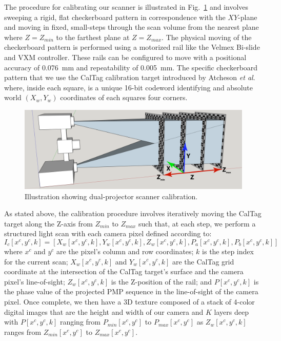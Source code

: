\documentclass[]{spie}  %
\begin{document}
The procedure for calibrating our scanner is illustrated in Fig.~\ref{Fig:20} and involves sweeping a rigid, flat checkerboard pattern in correspondence with the $XY$-plane and moving in fixed, small-steps through the scan volume from the nearest plane where $Z = Z_{min}$ to the farthest plane at $Z = Z_{max}$.  The physical moving of the checkerboard pattern is performed using a motorized rail like the Velmex Bi-slide and VXM controller.  These rails can be configured to move with a positional accuracy of 0.076~mm and repeatability of 0.005~mm.  The specific checkerboard pattern that we use the CalTag calibration target introduced by Atcheson \textit{et al}.~\cite{atch10} where, inside each square, is a unique 16-bit codeword identifying and absolute world $(X_w,Y_w)$ coordinates of each squares four corners.

\begin{figure}[!t]
\centerline{\includegraphics[width=6.6in]{Figures/SLICalibrationDual}}
\vspace{0.1in}
\caption{Illustration showing dual-projector scanner calibration.}
\label{Fig:20}
\end{figure} 

As stated above, the calibration procedure involves iteratively moving the CalTag target along the Z-axis from $Z_{min}$ to $Z_{max}$ such that, at each step, we perform a structured light scan with each camera pixel defined according to:
\begin{equation}
I_c[x^c, y^c, k] = [X_w[x^c, y^c, k], Y_w[x^c, y^c, k], Z_w[x^c, y^c, k], P_a[x^c, y^c, k], P_b[x^c, y^c, k]]
\label{calEqn}
\end{equation}
where $x^c$ and $y^c$ are the pixel’s column and row coordinates; $k$ is the step index for the current scan; $X_w[x^c, y^c, k]$ and $Y_w[x^c, y^c, k]$ are the CalTag grid coordinate at the intersection of the CalTag target’s surface and the camera pixel’s line-of-sight; $Z_w[x^c, y^c, k]$ is the Z-position of the rail; and $P[x^c, y^c, k]$ is the phase value of the projected PMP sequence in the line-of-sight of the camera pixel.  Once complete, we then have a 3D texture composed of a stack of 4-color digital images that are the height and width of our camera and $K$ layers deep with $P[x^c, y^c, k]$ ranging from $P_{min}[x^c, y^c]$ to $P_{max}[x^c, y^c]$ as $Z_w[x^c, y^c, k]$ ranges from $Z_{min}[x^c, y^c]$ to $Z_{max}[x^c, y^c]$.
\end{document}
